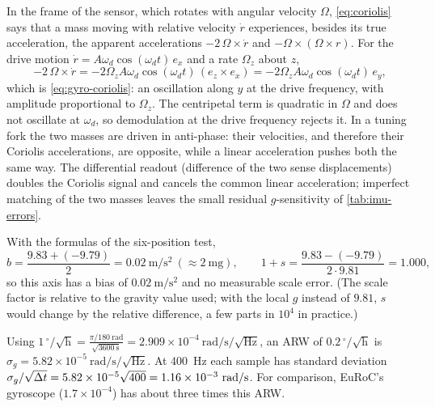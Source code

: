 \begin{solutions}
  \item In the frame of the sensor, which rotates with angular velocity $\Omega$, \eqref{eq:coriolis} says that a mass moving with relative velocity $\dot r$
        experiences, besides its true acceleration, the apparent accelerations $-2\,\Omega\times\dot r$ and $-\Omega\times(\Omega\times r)$. For the drive motion
        $\dot r = A\omega_d\cos(\omega_dt)\,e_x$ and a rate $\Omega_z$ about $z$,
        \[
          -2\,\Omega\times\dot r = -2\Omega_zA\omega_d\cos(\omega_dt)\,(e_z\times e_x) = -2\Omega_zA\omega_d\cos(\omega_dt)\,e_y ,
        \]
        which is \eqref{eq:gyro-coriolis}: an oscillation along $y$ at the drive frequency, with amplitude proportional to $\Omega_z$. The centripetal term is quadratic in $\Omega$ and does not oscillate at $\omega_d$, so demodulation at the drive frequency rejects it.
        In a tuning fork the two masses are driven in anti-phase: their velocities, and therefore their Coriolis accelerations, are opposite, while a
        linear acceleration pushes both the same way. The differential readout (difference of the two sense displacements) doubles the Coriolis
        signal and cancels the common linear acceleration; imperfect matching of the two masses leaves the small residual $g$-sensitivity of
        \cref{tab:imu-errors}.

  \item With the formulas of the six-position test,
        \[
          b = \frac{9.83 + (-9.79)}{2} = 0.02~\mathrm{m/s^2} \ (\approx 2~\mathrm{mg}), \qquad 1 + s = \frac{9.83 - (-9.79)}{2\cdot9.81} = 1.000 ,
        \]
        so this axis has a bias of $0.02~\mathrm{m/s^2}$ and no measurable scale error. (The scale factor is relative to the gravity value used; with the local
        $g$ instead of $9.81$, $s$ would change by the relative difference, a few parts in $10^4$ in practice.)

  \item Using $1\,^\circ/\sqrt{\mathrm h} = \frac{\pi/180~\mathrm{rad}}{\sqrt{3600~\mathrm s}} = 2.909\times10^{-4}~\mathrm{rad/s/\sqrt{Hz}}$, an ARW of $0.2\,^\circ/\sqrt{\mathrm h}$ is
        $\sigma_g = 5.82\times10^{-5}~\mathrm{rad/s/\sqrt{Hz}}$. At 400~Hz each sample has standard deviation $\sigma_g/\sqrt{{\Delta t}} = 5.82\times10^{-5}\sqrt{400} =
        1.16\times10^{-3}~\mathrm{rad/s}$. For comparison, EuRoC's gyroscope ($1.7\times10^{-4}$) has about three times this ARW.


\end{solutions}
